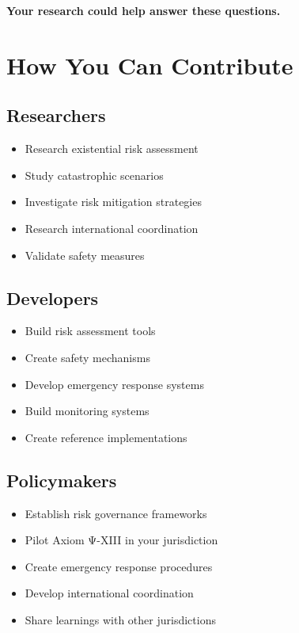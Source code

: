\textbf{Your research could help answer these questions.}

\vspace{0.5cm}

\section{How You Can Contribute}

\subsection{Researchers}

\begin{itemize}
    \item Research existential risk assessment
    \item Study catastrophic scenarios
    \item Investigate risk mitigation strategies
    \item Research international coordination
    \item Validate safety measures
\end{itemize}

\subsection{Developers}

\begin{itemize}
    \item Build risk assessment tools
    \item Create safety mechanisms
    \item Develop emergency response systems
    \item Build monitoring systems
    \item Create reference implementations
\end{itemize}

\subsection{Policymakers}

\begin{itemize}
    \item Establish risk governance frameworks
    \item Pilot Axiom Ψ-XIII in your jurisdiction
    \item Create emergency response procedures
    \item Develop international coordination
    \item Share learnings with other jurisdictions
\end{itemize}

